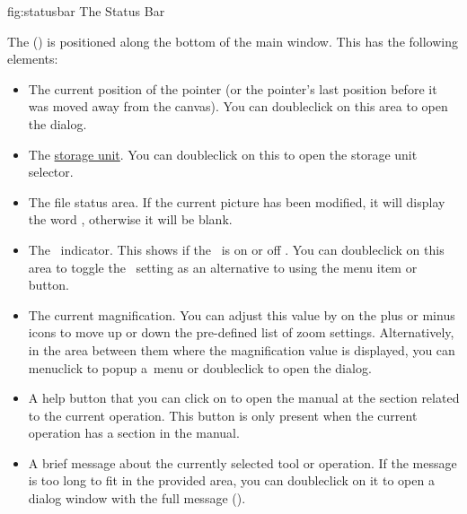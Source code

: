 \FloatFig
  {fig:statusbar}
  {}
  {The Status Bar}

The  () is positioned along
the bottom of the main window. This has the following elements:

\begin{itemize}

\item The current position of the pointer (or the pointer's last
position before it was moved away from the \gls{canvas}). You can
\gls{doubleclick} on this area to open the  dialog.

\item The \hyperref[sec:controlsettings]{storage unit}. You
can \gls{doubleclick} on this to open the storage unit selector.

\item The file status area.  If the current picture has been modified, it
will display the word , otherwise it
will be blank.

\item The \gridlock\ indicator. This shows if the \gridlock\ is on
 or off . You can
\gls{doubleclick} on this area to toggle the \gridlock\ setting as an
alternative to using the  menu item or
button.

\item The current magnification. You can adjust this value by
 on the plus or minus icons to move up or
down the pre-defined list of zoom settings. Alternatively, in the area
between them where the magnification value is displayed, you can
\gls{menuclick} to popup a~menu or \gls{doubleclick} to open the
 dialog.

\item A help button  that you can \gls{click} on
to open the manual at the section related to the current operation.
This button is only present when the current operation has a section
in the manual.

\item A brief message about the currently selected tool or
operation. If the message is too long to fit in the provided area,
you can \gls{doubleclick} on it to open a dialog window with the
full message ().

\end{itemize}

